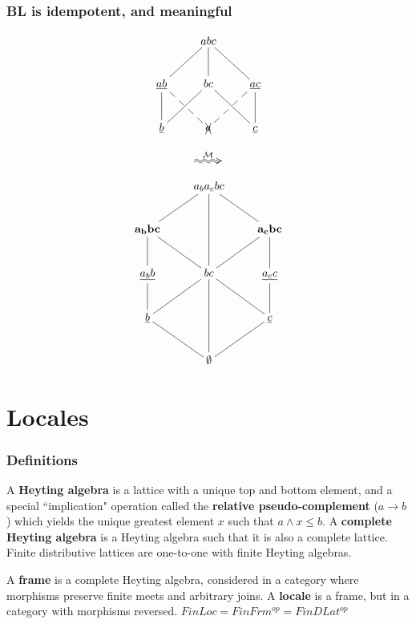 \documentclass{beamer}
\newcommand{\Mcc}{\mathcal{M}}
\begin{document}
\begin{frame}
\frametitle{BL is idempotent, and meaningful}
\begin{figure}
\begin{minipage}[c]{0.4\textwidth}
\begin{equation*}
    \xymatrix{& abc \ar@{-}[dl] \ar@{-}[d] \ar@{-}[dr] & \\
      \underline{ab} \ar@{-}[d] \ar@{--}[dr] & bc \ar@{-}[dl] \ar@{-}[dr] &
        \underline{ac} \ar@{-}[d] \ar@{--}[dl] \\
        \underline{b} & \xcancel{a}  & \underline{c} }
\end{equation*}
\end{minipage}
\begin{minipage}[c]{0.08\textwidth}
  \begin{equation*}
    \xymatrix{\ar@2{~>}[r]^{\Mcc} &}
  \end{equation*}
\end{minipage}
\begin{minipage}[c]{0.4\textwidth}
\begin{equation*}
    \xymatrix{& a_ba_cbc \ar@{-}[dl] \ar@{-}[dd] \ar@{-}[dr] & \\
      \mathbf{a_bbc} \ar@{-}[d] \ar@{-}[dr] & &
        \mathbf{a_cbc} \ar@{-}[d] \ar@{-}[dl]\\
        \underline{a_bb} \ar@{-}[d] & bc \ar@{-}[dl] \ar@{-}[dd] \ar@{-}[dr] &
          \underline{a_cc} \ar@{-}[d] \\
         \underline{b} \ar@{-}[dr] & & \underline{c} \ar@{-}[dl] \\
      & \mathbf{\emptyset} }
\end{equation*}
\end{minipage}
\end{figure}
\end{frame}

\section{Locales}
\begin{frame}
\frametitle{Definitions}
A \textbf{Heyting algebra} is a lattice with a unique top and bottom element, and a special ``implication" operation called the \textbf{relative pseudo-complement} (\(a \rightarrow b\)) which yields the unique greatest element \(x\) such that \(a \wedge x \le b\). A \textbf{complete Heyting algebra} is a Heyting algebra such that it is also a complete lattice. Finite distributive lattices are one-to-one with finite Heyting algebras.

A \textbf{frame} is a complete Heyting algebra, considered in a category where morphisms preserve finite meets and arbitrary joins. A \textbf{locale} is a frame, but in a category with morphisms reversed. \(FinLoc = FinFrm^{op} = FinDLat^{op}\)
\end{frame}
\end{document}
